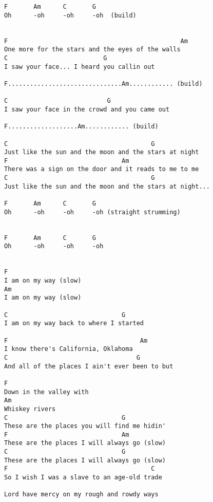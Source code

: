 \documentclass[leqno]{memoir}
\begin{document}
\begin{verbatim}
F       Am      C       G
Oh      -oh     -oh     -oh  (build)


F                                               Am
One more for the stars and the eyes of the walls
C                          G    
I saw your face... I heard you callin out

F...............................Am............ (build)

C                           G
I saw your face in the crowd and you came out

F...................Am............ (build)

C                                       G
Just like the sun and the moon and the stars at night
F                               Am
There was a sign on the door and it reads to me to me 
C                                       G
Just like the sun and the moon and the stars at night...

F       Am      C       G
Oh      -oh     -oh     -oh (straight strumming)


F       Am      C       G
Oh      -oh     -oh     -oh


F       
I am on my way (slow)
Am              
I am on my way (slow)

C                               G
I am on my way back to where I started

F                                    Am
I know there's California, Oklahoma
C                                   G
And all of the places I ain't ever been to but

F
Down in the valley with
Am
Whiskey rivers
C                               G
These are the places you will find me hidin'
F                               Am      
These are the places I will always go (slow)
C                               G
These are the places I will always go (slow)
F                                       C
So I wish I was a slave to an age-old trade

Lord have mercy on my rough and rowdy ways
\end{verbatim}
\newpage
\end{document}
